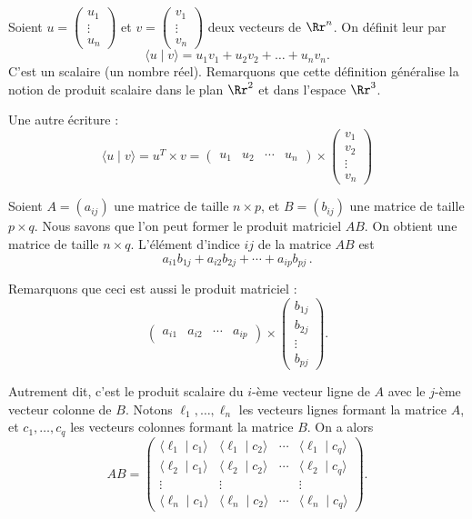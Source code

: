 \documentclass[class=report,crop=false]{standalone}
\begin{document}
Soient $u = \left(\begin{smallmatrix} u_1\\ \vdots \\ u_n \end{smallmatrix}\right)$
et $v = \left(\begin{smallmatrix} v_1\\ \vdots \\ v_n \end{smallmatrix}\right)$
deux vecteurs de $\Rr^n$. On définit leur  par
$$\langle u \mid v \rangle = u_1 v_1 + u_2 v_2 + \dots + u_nv_n.$$
C'est un scalaire (un nombre réel). Remarquons que cette définition généralise la notion
de produit scalaire dans le plan $\Rr^2$ et dans l'espace $\Rr^3$.

Une autre écriture :
$$\langle u \mid v \rangle = u^T \times v =
\begin{pmatrix} u_1 & u_2 & \cdots & u_n \end{pmatrix}\times
\begin{pmatrix} v_1 \\ v_2 \\ \vdots \\ v_n \end{pmatrix} $$


\bigskip


Soient $A = (a_{ij})$ une matrice de taille $n\times p$, et $B = (b_{ij})$ une matrice de taille $p \times q$.
Nous savons que l'on peut
former le produit matriciel $AB$. On obtient une matrice de taille
$n\times q$. L'élément d'indice $ij$ de la matrice $AB$ est
$$
a_{i1} b_{1j} + a_{i2} b_{2j} + \cdots + a_{ip} b_{pj}\, .
$$



Remarquons que ceci est  aussi le produit matriciel :
$$\begin{pmatrix} a_{i1}& a_{i2} &\cdots &a_{ip}\end{pmatrix}\times
\begin{pmatrix}b_{1j}\\ b_{2j}\\ \vdots\\ b_{pj} \end{pmatrix}. $$

Autrement dit, c'est le produit scalaire du $i$-ème vecteur ligne de $A$ avec
le $j$-ème vecteur colonne de $B$. Notons $\ell_1, \dots , \ell_n$ les vecteurs lignes
formant la matrice $A$, et $c_1, \dots ,c_q$ les vecteurs colonnes formant la matrice $B$. On a alors
$$
AB = \begin{pmatrix}
\langle\ell_1 \mid c_1\rangle & \langle\ell_1 \mid c_2\rangle &\cdots & \langle\ell_1\mid c_q\rangle \\
\langle\ell_2 \mid c_1\rangle & \langle\ell_2 \mid c_2\rangle & \cdots & \langle\ell_2\mid c_q\rangle \\
\vdots & \vdots & &\vdots\\
\langle\ell_n \mid c_1\rangle & \langle\ell_n \mid c_2\rangle & \cdots & \langle\ell_n \mid c_q\rangle
\end{pmatrix}.$$
\end{document}
